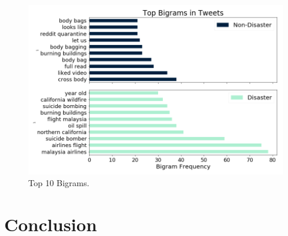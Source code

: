 \documentclass[journal, ]{IEEEtran}
\let\MYoriglatexcaption\caption
\renewcommand{\caption}[2][\relax]{\MYoriglatexcaption[#2]{#2}}
\begin{document}
\begin{figure}[hbt!]
  \centering
  \includegraphics[width=\linewidth]{../figures/ngrams.png}
  \caption{Top 10 Bigrams.}
  \label{fig:ngram}
\end{figure}

\section{Conclusion}

\ifCLASSOPTIONcaptionsoff
  \newpage
\fi




%
%


\end{document}
